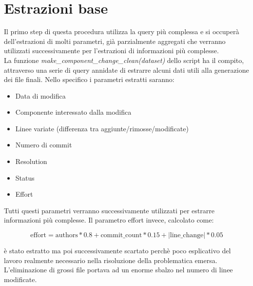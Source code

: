 \documentclass[%
    corpo=12pt,
    twoside,
    oldstyle,
    autoretitolo,
    greek,
    evenboxes,
]{toptesi}
\begin{document}
\section{Estrazioni base}
Il primo step di questa procedura utilizza la query più complessa e si occuperà dell'estrazioni di molti parametri, già parzialmente aggregati che verranno utilizzati successivamente per l'estrazioni di informazioni più complesse.\\
La funzione \textit{make\_component\_change\_clean(dataset)} dello script ha il compito, attraverso una serie di query annidate di estrarre alcuni dati utili alla generazione dei file finali. Nello specifico i parametri estratti saranno:
\begin{itemize}
  \item Data di modifica
  \item Componente interessato dalla modifica
  \item Linee variate (differenza tra aggiunte/rimosse/modificate)
  \item Numero di commit
  \item Resolution
  \item Status
  \item Effort
\end{itemize}
Tutti questi parametri verranno successivamente utilizzati per estrarre informazioni più complesse. Il parametro effort invece, calcolato come:
\begin{center}
  \begin{equation}
    \textrm{effort} = \textrm{authors} * 0.8 + \textrm{commit\_count} * 0.15 + |\textrm{line\_change}| * 0.05
  \end{equation}
\end{center}
è stato estratto ma poi successivamente scartato perchè poco esplicativo del lavoro realmente necessario nella risoluzione della problematica emersa. L'eliminazione di grossi file portava ad un enorme sbalzo nel numero di linee modificate.\\
\end{document}
